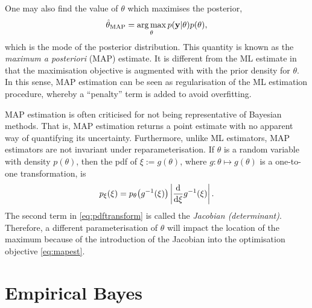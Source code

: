 One may also find the value of $\theta$ which maximises the posterior,
\begin{equation}\label{eq:mapest}
  \hat\theta_{\text{MAP}} = \operatorname*{arg\,max}_\theta p({\mathbf y}|\theta)p(\theta),
\end{equation}
which is the mode of the posterior distribution.
This quantity is known as the \emph{maximum a posteriori} (MAP) estimate. 
It is different from the ML estimate in that the maximisation objective is augmented with with the prior density for $\theta$.
In this sense, MAP estimation can be seen as regularisation of the ML estimation procedure, whereby a ``penalty'' term is added to avoid overfitting.

MAP estimation is often criticised for not being representative of Bayesian methods.
That is, MAP estimation returns a point estimate with no apparent way of quantifying its uncertainty.
Furthermore, unlike ML estimators, MAP estimators are not invariant under reparameterisation.
If $\theta$ is a random variable with density $p(\theta)$, then the pdf of $\xi := g(\theta)$, where $g:\theta \mapsto g(\theta)$ is a one-to-one transformation, is
\begin{equation}\label{eq:pdftransform}
  p_\xi(\xi) = p_\theta\big(g^{-1}(\xi)\big) \left\vert \frac{\text{d} }{\text{d} \xi} g^{-1}(\xi) \right\vert.
\end{equation}
The second term in \cref{eq:pdftransform} is called the \emph{Jacobian (determinant)}.
Therefore, a different parameterisation of $\theta$ will impact the location of the maximum because of the introduction of the Jacobian into the optimisation objective \cref{eq:mapest}.

\section{Empirical Bayes}

